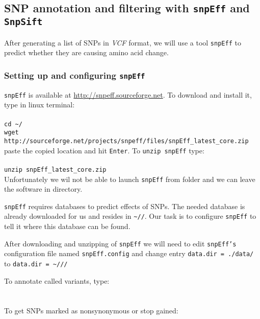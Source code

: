 \subsection{SNP annotation and filtering with \texttt{snpEff} and \texttt{SnpSift}}
After generating a list of SNPs in \textit{VCF} format,
we will use a tool \texttt{snpEff} to predict whether they are causing
amino acid change.
\subsubsection{Setting up and configuring \texttt{snpEff}}
\texttt{snpEff} is available at \url{http://snpeff.sourceforge.net}.
To download and install it, type in linux terminal:\\~\\
\texttt{cd \textasciitilde/\progDir} \\
\texttt{wget http://sourceforge.net/projects/snpeff/files/snpEff\_latest\_core.zip} \\

paste the copied location and hit \texttt{Enter}. To \texttt{unzip snpEff} type:\\~\\
\texttt{unzip snpEff\_latest\_core.zip}\\

Unfortunately we wil not be able to launch \texttt{snpEff} from \texttt{\binDir} folder
and we can leave the software in \texttt{\progDir} directory.

\texttt{snpEff} requires databases to predict effects of SNPs.
The needed database is already downloaded for us and resides in
\texttt{\textasciitilde/\dataDir/\snpEffData}. Our task is to 
configure \texttt{snpEff} to tell it where this database can be found.

After downloading and unzipping of \texttt{snpEff} we will need to
edit \texttt{snpEff's} configuration file named \texttt{snpEff.config}
and change entry \texttt{data.dir = ./data/} to \texttt{data.dir = \textasciitilde/\dataDir/\snpEffData/}

To annotate called variants, type:\\~\\
\\

To get SNPs marked as nonsynonymous or stop gained:\\~\\
\\

